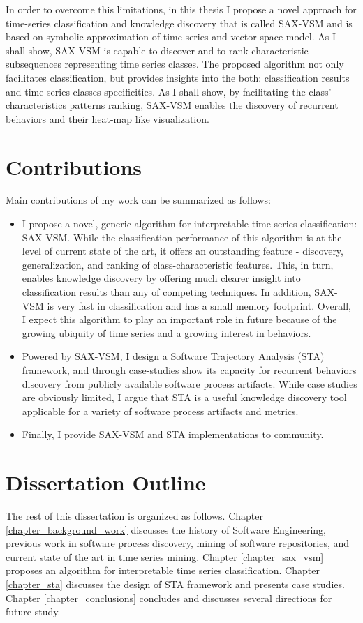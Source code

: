 In order to overcome this limitations, in this thesis I propose a novel approach for time-series classification and 
knowledge discovery that is called SAX-VSM and is based on symbolic approximation of time series and vector space model. 
As I shall show, SAX-VSM is capable to discover and to rank characteristic subsequences representing time series classes. 
The proposed algorithm not only facilitates classification, but provides insights into the both: classification results 
and time series classes specificities. As I shall show, by facilitating the class' characteristics patterns ranking,
SAX-VSM enables the discovery of recurrent behaviors and their heat-map like visualization. 

\section{Contributions}\label{section_contributions}
Main contributions of my work can be summarized as follows: 
\begin{itemize}
\item I propose a novel, generic algorithm for interpretable time series classification: SAX-VSM. 
While the classification performance of this algorithm is at the level of current state of the art, 
it offers an outstanding feature - discovery, generalization, and ranking of class-characteristic features. 
This, in turn, enables knowledge discovery by offering much clearer insight into classification results than any of 
competing techniques.
In addition, SAX-VSM is very fast in classification and has a small memory footprint. 
Overall, I expect this algorithm to play an important role in future because of the growing ubiquity of time series and 
a growing interest in behaviors.
\item Powered by SAX-VSM, I design a Software Trajectory Analysis (STA) framework, and through case-studies 
show its capacity for recurrent behaviors discovery from publicly available software process
artifacts. While case studies are obviously limited, I argue that STA is a useful knowledge discovery tool applicable for a 
variety of software process artifacts and metrics. 
\item Finally, I provide SAX-VSM and STA implementations to community.
\end{itemize}

\section{Dissertation Outline}\label{section_organization}
The rest of this dissertation is organized as follows. Chapter \ref{chapter_background_work} discusses the history 
of Software Engineering, previous work in software process discovery, mining of software repositories, and current 
state of the art in time series mining. Chapter \ref{chapter_sax_vsm} proposes an algorithm for interpretable 
time series classification. Chapter \ref{chapter_sta} discusses the design of STA framework and presents case studies.
Chapter \ref{chapter_conclusions} concludes and discusses several directions for future study.